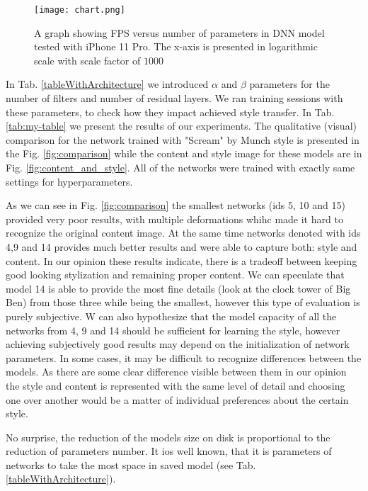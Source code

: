 \documentclass[a4paper,conference]{IEEEtran}
\newcommand{\ResidualLayerNumber}{\beta}
\begin{document}
\begin{figure}[ht!]
\caption{A graph showing FPS versus number of parameters in DNN model tested with iPhone 11 Pro. The x-axis is presented in logarithmic scale with scale factor of $1000$}
\label{graphFPS}
\centering
\texttt{[image: chart.png]}
\end{figure}



In Tab. \ref{tableWithArchitecture} we introduced $\alpha$ and $\ResidualLayerNumber$  parameters for the number of filters and number of residual layers. We ran training sessions with these parameters, to check how they impact achieved style transfer. In Tab. \ref{tab:my-table} we present the results of our experiments. The qualitative (visual) comparison for the network trained with "Scream" by Munch style is presented in the Fig. \ref{fig:comparison} while the content and style image for these models are in Fig. \ref{fig:content_and_style}. All of the networks were trained with exactly same settings for hyperparameters.

As we can see in Fig. \ref{fig:comparison} the smallest networks (ids 5, 10 and 15) provided very poor results, with multiple deformations whihc made it hard to recognize the original content image. At the same time networks denoted with ids 4,9 and 14 provides much better results and were able to capture both: style and content. In our opinion these results indicate, there is a tradeoff between keeping good looking stylization and remaining proper content. We can speculate that model 14 is able to provide the most fine details (look at the clock tower of Big Ben) from those three while being the smallest, however this type of evaluation is purely subjective. W can also hypothesize that the model capacity of all the  networks from 4, 9 and 14 should be sufficient for learning the style, however achieving subjectively good results may depend on the initialization of network parameters. In some  cases, it may be difficult to recognize differences between the models. As there are some clear difference visible between them in our opinion the style and content is represented with the same level of detail and choosing one over another would be a matter of individual preferences about the certain style. 


No surprise, the reduction of the models size on disk is proportional to the reduction of parameters number. It ios well known, that it is parameters of networks to take the most space in saved model (see Tab. \ref{tableWithArchitecture}). 
\end{document}
